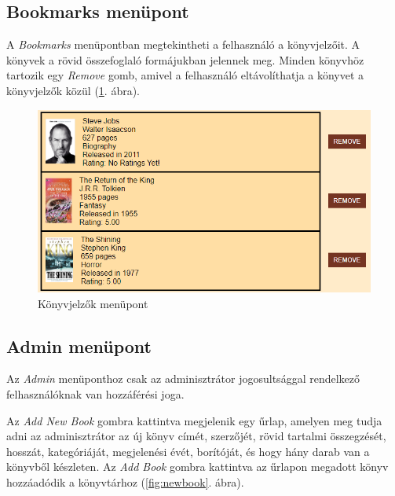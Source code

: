 \subsection{Bookmarks menüpont}

A \textit{Bookmarks} menüpontban megtekintheti a felhasználó a könyvjelzőit. A könyvek a rövid összefoglaló formájukban jelennek meg. Minden könyvhöz tartozik egy \textit{Remove} gomb, amivel a felhasználó eltávolíthatja a könyvet a könyvjelzők közül (\ref{fig:bookmarks}. ábra).

\begin{figure}[h]
    \centering
    \includegraphics[scale=0.65]{images/application/bookmarks.png}
    \caption{Könyvjelzők menüpont}
    \label{fig:bookmarks}
\end{figure}

\subsection{Admin menüpont}

Az \textit{Admin} menüponthoz csak az adminisztrátor jogosultsággal rendelkező felhasználóknak van hozzáférési joga. 

Az \textit{Add New Book} gombra kattintva megjelenik egy űrlap, amelyen meg tudja adni az adminisztrátor az új könyv címét, szerzőjét, rövid tartalmi összegzését, hosszát, kategóriáját, megjelenési évét, borítóját, és hogy hány darab van a könyvből készleten. Az \textit{Add Book} gombra kattintva az űrlapon megadott könyv hozzáadódik a könyvtárhoz (\ref{fig:newbook}. ábra).

